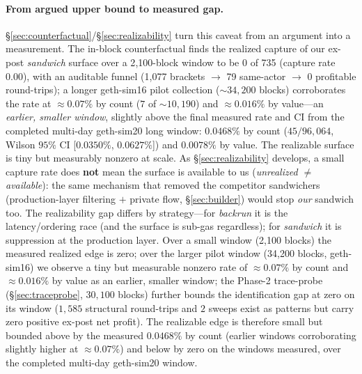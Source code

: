 \documentclass[11pt]{article}
\begin{document}
\paragraph{From argued upper bound to measured gap.}
\S\ref{sec:counterfactual}/\S\ref{sec:realizability} turn this caveat from an argument
into a measurement. The in-block counterfactual finds the realized capture of our
ex-post \emph{sandwich} surface over a 2{,}100-block window to be 0 of 735 (capture rate
0.00), with an auditable funnel (1{,}077 brackets $\to$ 79 same-actor $\to$ 0 profitable
round-trips); a longer geth-sim16 pilot collection ($\sim$$34{,}200$ blocks) corroborates
the rate at $\approx$$0.07\%$ by count ($7$ of $\sim$$10{,}190$) and
$\approx$$0.016\%$ by value---an \emph{earlier, smaller window}, slightly above the final measured
rate and CI from the completed multi-day geth-sim20 long window: $0.0468\%$ by count
($45/96{,}064$, Wilson $95\%$ CI [$0.0350\%$, $0.0627\%$]) and $0.0078\%$ by value. The realizable surface is tiny but measurably nonzero at scale. As
\S\ref{sec:realizability} develops, a small capture rate does \textbf{not} mean
the surface is available to us (\emph{unrealized $\neq$ available}): the same mechanism
that removed the competitor sandwichers (production-layer filtering $+$ private flow,
\S\ref{sec:builder}) would stop \emph{our} sandwich too. The realizability gap differs by
strategy---for \emph{backrun} it is the latency/ordering race (and the surface is sub-gas
regardless); for \emph{sandwich} it is suppression at the production layer. Over a
small window (2{,}100 blocks) the measured realized edge is zero; over the larger
pilot window (34{,}200 blocks, geth-sim16) we observe a tiny but measurable nonzero rate of
$\approx$$0.07\%$ by count and $\approx$$0.016\%$ by value as an earlier, smaller window; the Phase-2 trace-probe
(\S\ref{sec:traceprobe}, $30{,}100$ blocks) further bounds the identification gap at
zero on its window ($1{,}585$ structural round-trips and $2$ sweeps exist as patterns
but carry zero positive ex-post net profit). The realizable edge is therefore small
but bounded above by the measured $0.0468\%$ by count (earlier windows corroborating slightly higher at $\approx$$0.07\%$) and below by zero on
the windows measured, over the completed multi-day geth-sim20 window.
\end{document}
